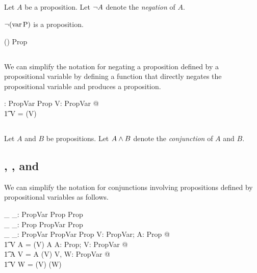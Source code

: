 \documentclass[11pt, oneside]{article}
\begin{document}
\subsection{}

Let $A$ be a proposition.
Let $\lnot A$ denote the {\it negation} of $A$.

\begin{example}
$\lnot(\operatorname{var} \mathrm{P})$ is a proposition.

\begin{zed}
	\notProp(\varProp \propP) \in Prop
\end{zed}

\end{example}

\subsection{}

We can simplify the notation for negating a proposition defined by a propositional variable 
by defining a function that directly negates the propositional variable and produces a proposition.

\begin{axdef}
	\notPropV: PropVar \inj Prop
\where
	\forall V: PropVar @ \\
	\t1	\notPropV V = \notProp(\varProp V)
\end{axdef}

\subsection{}

Let $A$ and $B$ be propositions.
Let $A \mathbin{\land} B$ denote the {\it conjunction} of $A$ and $B$.

\subsection{, , and }

We can simplify the notation for conjunctions involving propositions defined by propositional variables as follows.

\begin{axdef}
	\_ \andPropVP \_: PropVar \cross Prop \inj Prop \\
	\_ \andPropPV \_: Prop \cross PropVar \inj Prop \\
	\_ \andPropVV \_: PropVar \cross PropVar \inj Prop
\where
	\forall V: PropVar; A: Prop @ \\
	\t1	V \andPropVP A = (\varProp V) \andProp A
\also
	\forall A: Prop; V: PropVar @ \\
	\t1	A \andPropPV V = A \andProp (\varProp V)
\also
	\forall V, W: PropVar @ \\
	\t1	V \andPropVV W = (\varProp V) \andProp (\varProp W)
\end{axdef}
\end{document}
